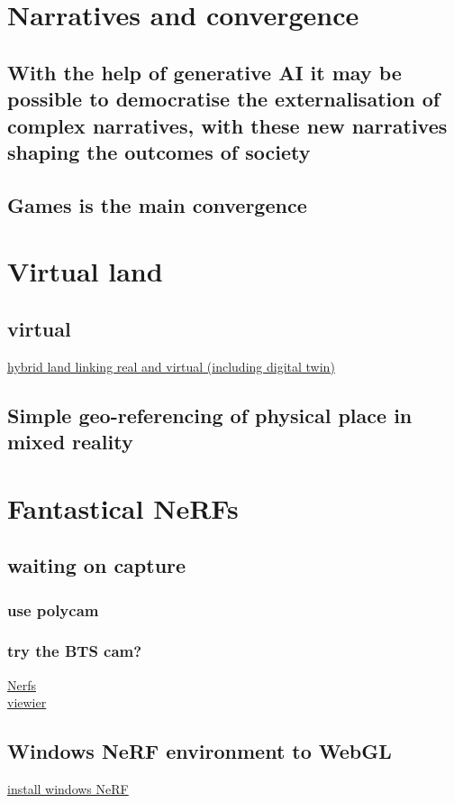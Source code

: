 \section{Narratives and convergence}
\subsection{With the help of generative AI it may be possible to democratise the externalisation of complex narratives, with these new narratives shaping the outcomes of society} \subsection{Games is the main convergence}
\section{Virtual land}
\subsection{virtual}
\href{https://labusinessjournal.com/featured/metahouse-could-be-first-of-many/}{hybrid land linking real and virtual (including digital twin)}\\
\subsection{Simple geo-referencing of physical place in mixed reality}
\section{Fantastical NeRFs}
\subsection{waiting on capture}
\subsubsection{use polycam}
\subsubsection{try the BTS cam?}
\href{https://www.matthewtancik.com/nerf}{Nerfs}\\
\href{https://github.com/sxyu/volrend}{viewier}\\
\subsection{Windows NeRF environment to WebGL}
\href{https://github.com/bycloudai/instant-ngp-Windows}{install windows NeRF}\\
